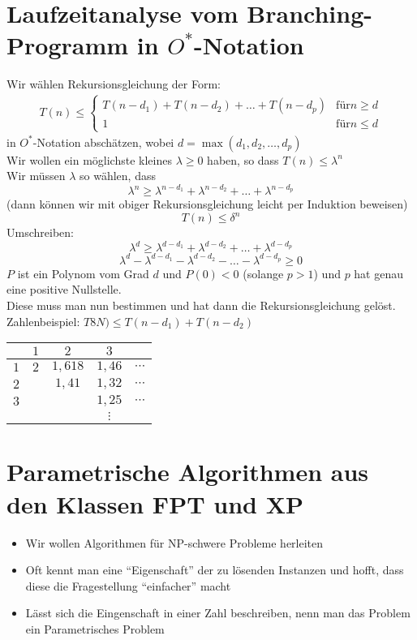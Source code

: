 \section{Laufzeitanalyse vom Branching-Programm in $O^*$-Notation}
Wir wählen Rekursionsgleichung der Form:
\begin{align*}
T(n) \leq \begin{cases}
T(n-d_1) + T(n-d_2) + \ldots + T(n-d_p)& \text{für} n\geq d\\
1 & \text{für} n \leq d
\end{cases}
\end{align*}
in $O^*$-Notation abschätzen, wobei $d=\max(d_1,d_2,\ldots,d_p)$\\
Wir wollen ein möglichste kleines $\lambda \geq 0$ haben, so dass $T(n) \leq \lambda^n$\\
Wir müssen $\lambda$ so wählen, dass
\[ \lambda^n \geq \lambda^{n-d_1} + \lambda^{n-d_2} + \ldots + \lambda^{n-d_p} \]
(dann können wir mit obiger Rekursionsgleichung leicht per Induktion beweisen)
\[ T(n) \leq \delta^n \]
Umschreiben:
\[ \lambda^d \geq \lambda^{d-d_1} + \lambda^{d-d_2} + \ldots + \lambda^{d-d_p} \]
\[ \lambda^d - \lambda^{d-d_1} - \lambda^{d-d_2} - \ldots - \lambda^{d-d_p} \geq 0 \]
$P$ ist ein Polynom vom Grad $d$ und $P(0) < 0$ (solange $p>1$) und $p$ hat genau eine positive Nullstelle.\\
Diese muss man nun bestimmen und hat dann die Rekursionsgleichung gelöst.\\
Zahlenbeispiel: $T8N) \leq T(n-d_1) + T(n-d_2)$\\
\begin{tabular}{l|cccc}
	 &$1$&$2$&$3$& \\\hline
	$1$&$2$&$1,618$&$1,46$&$\cdots$ \\
	$2$& &$1,41$&$1,32$&$\cdots$\\
	$3$& & &$1,25$&$\cdots$\\
	   & & &$\vdots$&
\end{tabular}
\section{Parametrische Algorithmen aus den Klassen FPT und XP}
\begin{itemize}
	\item Wir wollen Algorithmen für NP-schwere Probleme herleiten
	\item Oft kennt man eine "`Eigenschaft"' der zu lösenden Instanzen und hofft, dass diese die Fragestellung "`einfacher"' macht
	\item Lässt sich die Eingenschaft in einer Zahl beschreiben, nenn man das Problem ein Parametrisches Problem
\end{itemize}
